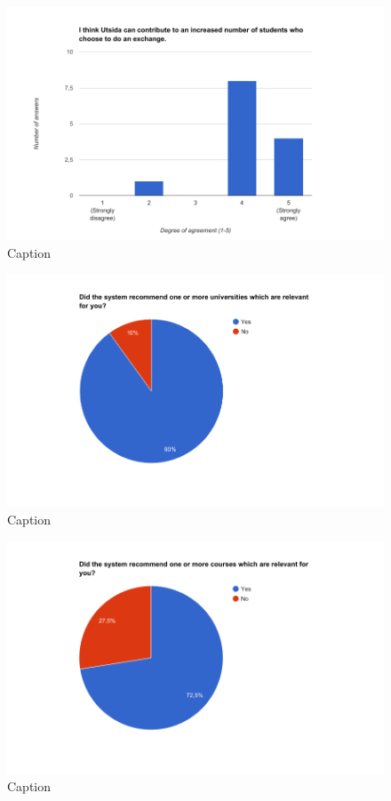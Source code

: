 \begin{figure}[h]
    \centering
    \includegraphics[width=1\textwidth]{fig/questionnaire2_diagrams/6.png}
    \caption[]{Caption}
    \label{fig:my_label}
\end{figure}

\begin{figure}[h]
    \centering
    \includegraphics[width=1\textwidth]{fig/questionnaire2_diagrams/7.png}
    \caption[]{Caption}
    \label{fig:my_label}
\end{figure}

\begin{figure}[h]
    \centering
    \includegraphics[width=1\textwidth]{fig/questionnaire2_diagrams/8.png}
    \caption[]{Caption}
    \label{fig:my_label}
\end{figure}


